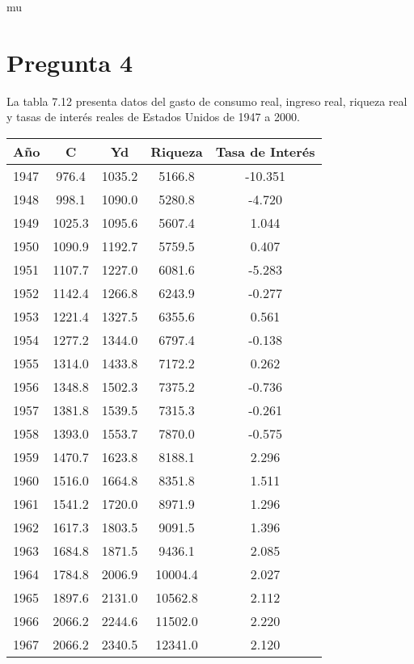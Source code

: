 mu\documentclass[10pt]{article}
\begin{document}
\section{Pregunta 4}
La tabla 7.12 presenta datos del gasto de consumo real, ingreso real, riqueza real y tasas de interés reales
de Estados Unidos de 1947 a 2000.
\begin{table}[H]
    \centering
    \tiny
    \begin{tabular}{lcccc}
        \hline
        \textbf{Año} & \textbf{C} & \textbf{Yd} & \textbf{Riqueza} & \textbf{Tasa de Interés} \\
        \hline
        1947 &  976.4 & 1035.2 &  5166.8 & -10.351 \\
        1948 &  998.1 & 1090.0 &  5280.8 &  -4.720 \\
        1949 & 1025.3 & 1095.6 &  5607.4 &   1.044 \\
        1950 & 1090.9 & 1192.7 &  5759.5 &   0.407 \\
        1951 & 1107.7 & 1227.0 &  6081.6 &  -5.283 \\
        1952 & 1142.4 & 1266.8 &  6243.9 &  -0.277 \\
        1953 & 1221.4 & 1327.5 &  6355.6 &   0.561 \\
        1954 & 1277.2 & 1344.0 &  6797.4 &  -0.138 \\
        1955 & 1314.0 & 1433.8 &  7172.2 &   0.262 \\
        1956 & 1348.8 & 1502.3 &  7375.2 &  -0.736 \\
        1957 & 1381.8 & 1539.5 &  7315.3 &  -0.261 \\
        1958 & 1393.0 & 1553.7 &  7870.0 &  -0.575 \\
        1959 & 1470.7 & 1623.8 &  8188.1 &   2.296 \\
        1960 & 1516.0 & 1664.8 &  8351.8 &   1.511 \\
        1961 & 1541.2 & 1720.0 &  8971.9 &   1.296 \\
        1962 & 1617.3 & 1803.5 &  9091.5 &   1.396 \\
        1963 & 1684.8 & 1871.5 &  9436.1 &   2.085 \\
        1964 & 1784.8 & 2006.9 & 10004.4 &   2.027 \\
        1965 & 1897.6 & 2131.0 & 10562.8 &   2.112 \\
        1966 & 2066.2 & 2244.6 & 11502.0 &   2.220 \\
        1967 & 2066.2 & 2340.5 & 12341.0 &   2.120 \\

\end{tabular}
\end{table}
\end{document}

